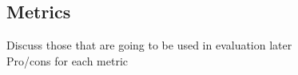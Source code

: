 \subsection{Metrics}
Discuss those that are going to be used in evaluation later \\
Pro/cons for each metric

